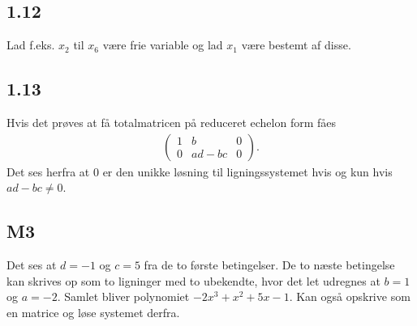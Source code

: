 		\subsection{1.12} 

			Lad f.eks. $x_2$ til $x_6$ være frie variable og lad $x_1$ være bestemt af disse.

		\subsection{1.13}

			Hvis det prøves at få totalmatricen på reduceret echelon form fåes
				\begin{align*}
					\left(\begin{array}{cc|c} {1} & {b} & {0} \\ {0} & {ad-bc} & {0} \end{array}\right).
				\end{align*} 
			Det ses herfra at $0$ er den unikke løsning til ligningssystemet hvis og kun hvis $ad-bc\neq 0$.

		\subsection{M3}

			Det ses at $d=-1$ og $c=5$ fra de to første betingelser. De to næste betingelse kan skrives op som to ligninger med to ubekendte, hvor det let udregnes at $b=1$ og $a=-2$. Samlet bliver polynomiet $-2x^3+x^2+5x-1$. Kan også opskrive som en matrice og løse systemet derfra.

















